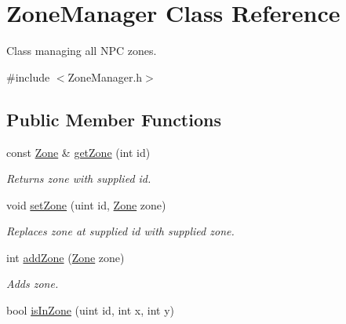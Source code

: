 \hypertarget{classZoneManager}{\section{Zone\-Manager Class Reference}
\label{classZoneManager}
}


Class managing all N\-P\-C zones.  




{\ttfamily \#include $<$Zone\-Manager.\-h$>$}

\subsection*{Public Member Functions}
\begin{DoxyCompactItemize}
\item 
\hypertarget{classZoneManager_ac543f20549084fb9ba57f7e949822fe8}{const \hyperlink{structZone}{Zone} \& \hyperlink{classZoneManager_ac543f20549084fb9ba57f7e949822fe8}{get\-Zone} (int id)}\label{classZoneManager_ac543f20549084fb9ba57f7e949822fe8}

\begin{DoxyCompactList}\small\item\em Returns zone with supplied id. \end{DoxyCompactList}\item 
\hypertarget{classZoneManager_a2a20e8af125ca32efe564ca30b965463}{void \hyperlink{classZoneManager_a2a20e8af125ca32efe564ca30b965463}{set\-Zone} (uint id, \hyperlink{structZone}{Zone} zone)}\label{classZoneManager_a2a20e8af125ca32efe564ca30b965463}

\begin{DoxyCompactList}\small\item\em Replaces zone at supplied id with supplied zone. \end{DoxyCompactList}\item 
\hypertarget{classZoneManager_aed2219b748110c4b13d7673687340cc8}{int \hyperlink{classZoneManager_aed2219b748110c4b13d7673687340cc8}{add\-Zone} (\hyperlink{structZone}{Zone} zone)}\label{classZoneManager_aed2219b748110c4b13d7673687340cc8}

\begin{DoxyCompactList}\small\item\em Adds zone. \end{DoxyCompactList}\item 
\hypertarget{classZoneManager_abbba8ac03874e3642408b916647b7fe3}{bool \hyperlink{classZoneManager_abbba8ac03874e3642408b916647b7fe3}{is\-In\-Zone} (uint id, int x, int y)}\label{classZoneManager_abbba8ac03874e3642408b916647b7fe3}


\end{DoxyCompactItemize}

